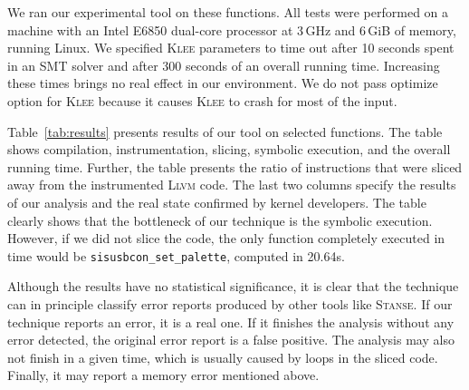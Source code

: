 \documentclass[10pt]{llncs}
\begin{document}
We ran our experimental tool on these functions. All tests were performed on
a machine with an Intel E6850 dual-core processor at 3\,GHz and 6\,GiB of
memory, running Linux. We specified \textsc{Klee} parameters to time out after
10 seconds spent in an SMT solver and after 300 seconds of an overall running
time. Increasing these times brings no real effect in our environment. We do
not pass optimize option for \textsc{Klee} because it causes \textsc{Klee} to
crash for most of the input.


Table~\ref{tab:results} presents results of our tool on selected functions.
The table shows compilation, instrumentation, slicing, symbolic execution,
and the overall running time. Further, the table presents the ratio of
instructions that were sliced away from the instrumented \textsc{Llvm} code.
The last two columns specify the results of our analysis and the real state
confirmed by kernel developers. The table clearly shows that the bottleneck
of our technique is the symbolic execution. However, if we did not slice the
code, the only function completely executed in time would be
\texttt{sisusbcon\_set\_palette}, computed in 20.64s.

Although the results have no statistical significance, it is clear that the
technique can in principle classify error reports produced by other tools like
\textsc{Stanse}. If our technique reports an error, it is a real one. If it
finishes the analysis without any error detected, the original error report is
a false positive. The analysis may also not finish in a given time, which is
usually caused by loops in the sliced code. Finally, it may report a memory
error mentioned above.


\end{document}
